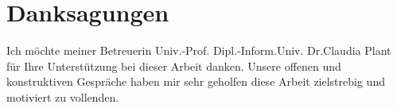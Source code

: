 

\chapter*{Danksagungen} %
\label{cha:acknowledgements}
\noindent

Ich möchte meiner Betreuerin Univ.-Prof. Dipl.-Inform.Univ. Dr.Claudia Plant für Ihre Unterstützung bei dieser Arbeit danken. Unsere offenen und konstruktiven Gespräche haben mir sehr geholfen diese Arbeit zielstrebig und motiviert zu vollenden.

